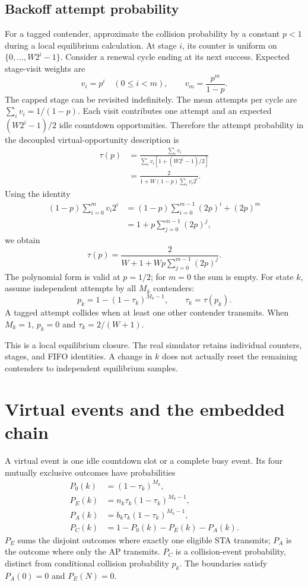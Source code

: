 \documentclass[11pt,a4paper]{article}
\begin{document}
\subsection{Backoff attempt probability}
For a tagged contender, approximate the collision probability by a constant
$p<1$ during a local equilibrium calculation. At stage $i$, its counter is
uniform on $\{0,\ldots,W2^i-1\}$. Consider a renewal cycle ending at its next
success. Expected stage-visit weights are
\begin{equation}
v_i=p^i\quad(0\leq i<m),\qquad v_m=\frac{p^m}{1-p}.
\end{equation}
The capped stage can be revisited indefinitely. The mean attempts per cycle
are $\sum_i v_i=1/(1-p)$. Each visit contributes one attempt and an expected
$(W2^i-1)/2$ idle countdown opportunities. Therefore the attempt probability
in the decoupled virtual-opportunity description is
\begin{align}
\tau(p)&=\frac{\sum_i v_i}{\sum_i v_i[1+(W2^i-1)/2]}\\
&=\frac{2}{1+W(1-p)\sum_i v_i2^i}.
\end{align}
Using the identity
\begin{align}
(1-p)\sum_{i=0}^{m}v_i2^i
&=(1-p)\sum_{i=0}^{m-1}(2p)^i+(2p)^m\\
&=1+p\sum_{j=0}^{m-1}(2p)^j,
\end{align}
we obtain
\begin{equation}\label{eq:tau}
\boxed{\tau(p)=\frac{2}{W+1+Wp\sum_{j=0}^{m-1}(2p)^j}}.
\end{equation}
The polynomial form is valid at $p=1/2$; for $m=0$ the sum is empty.
For state $k$, assume independent attempts by all $M_k$ contenders:
\begin{equation}\label{eq:fixed}
p_k=1-(1-\tau_k)^{M_k-1},\qquad \tau_k=\tau(p_k).
\end{equation}
A tagged attempt collides when at least one other contender transmits. When
$M_k=1$, $p_k=0$ and $\tau_k=2/(W+1)$.

This is a local equilibrium closure. The real simulator retains individual
counters, stages, and FIFO identities. A change in $k$ does not actually
reset the remaining contenders to independent equilibrium samples.

\section{Virtual events and the embedded chain}
A virtual event is one idle countdown slot or a complete busy event. Its
four mutually exclusive outcomes have probabilities
\begin{align}
P_0(k)&=(1-\tau_k)^{M_k},\\
P_E(k)&=n_k\tau_k(1-\tau_k)^{M_k-1},\\
P_A(k)&=b_k\tau_k(1-\tau_k)^{M_k-1},\\
P_C(k)&=1-P_0(k)-P_E(k)-P_A(k).
\end{align}
$P_E$ sums the disjoint outcomes where exactly one eligible STA transmits;
$P_A$ is the outcome where only the AP transmits. $P_C$ is a collision-event
probability, distinct from conditional collision probability $p_k$.
The boundaries satisfy $P_A(0)=0$ and $P_E(N)=0$.
\end{document}
